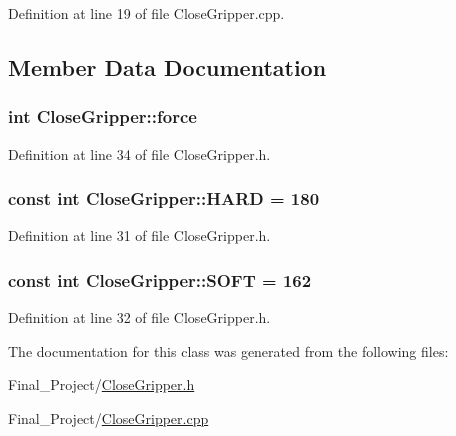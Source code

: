 Definition at line 19 of file Close\-Gripper.\-cpp.



\subsection{Member Data Documentation}
\hypertarget{classCloseGripper_ac90b3c4ad2ba86181bdfa5a3f926593c}{
\subsubsection[{force}]{\setlength{\rightskip}{0pt plus 5cm}int Close\-Gripper\-::force\hspace{0.3cm}{\ttfamily [private]}}}\label{classCloseGripper_ac90b3c4ad2ba86181bdfa5a3f926593c}


Definition at line 34 of file Close\-Gripper.\-h.

\hypertarget{classCloseGripper_af1d1dab59b0bddacb0e82e676e47797a}{
\subsubsection[{H\-A\-R\-D}]{\setlength{\rightskip}{0pt plus 5cm}const int Close\-Gripper\-::\-H\-A\-R\-D = 180\hspace{0.3cm}{\ttfamily [static]}}}\label{classCloseGripper_af1d1dab59b0bddacb0e82e676e47797a}


Definition at line 31 of file Close\-Gripper.\-h.

\hypertarget{classCloseGripper_a2b6cac5f41e2d57f180fdcf18aacae45}{
\subsubsection[{S\-O\-F\-T}]{\setlength{\rightskip}{0pt plus 5cm}const int Close\-Gripper\-::\-S\-O\-F\-T = 162\hspace{0.3cm}{\ttfamily [static]}}}\label{classCloseGripper_a2b6cac5f41e2d57f180fdcf18aacae45}


Definition at line 32 of file Close\-Gripper.\-h.



The documentation for this class was generated from the following files\-:\begin{DoxyCompactItemize}
\item 
Final\-\_\-\-Project/\hyperlink{CloseGripper_8h}{Close\-Gripper.\-h}\item 
Final\-\_\-\-Project/\hyperlink{CloseGripper_8cpp}{Close\-Gripper.\-cpp}\end{DoxyCompactItemize}
